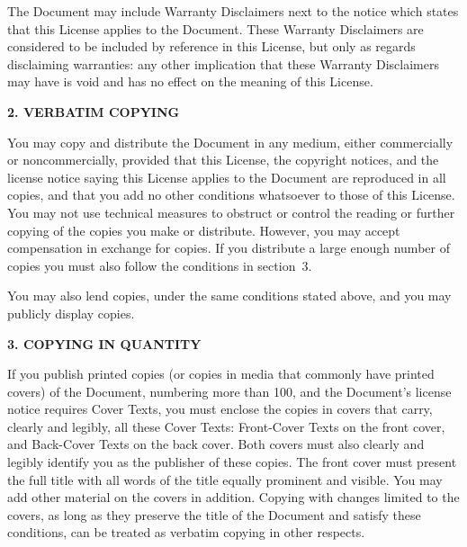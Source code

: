 \documentclass[10pt,a4paper,ngerman,titlepage,tocindentauto]{article}
\begin{document}
\begin{multicols}{3}
{					The Document may include Warranty Disclaimers next to the notice which
					states that this License applies to the Document.  These Warranty
					Disclaimers are considered to be included by reference in this
					License, but only as regards disclaiming warranties: any other
					implication that these Warranty Disclaimers may have is void and has
					no effect on the meaning of this License.


					\begin{center}
					{\bf 2. VERBATIM COPYING\par}
					\end{center}

					You may copy and distribute the Document in any medium, either
					commercially or noncommercially, provided that this License, the
					copyright notices, and the license notice saying this License applies
					to the Document are reproduced in all copies, and that you add no other
					conditions whatsoever to those of this License.  You may not use
					technical measures to obstruct or control the reading or further
					copying of the copies you make or distribute.  However, you may accept
					compensation in exchange for copies.  If you distribute a large enough
					number of copies you must also follow the conditions in section~3.

					You may also lend copies, under the same conditions stated above, and
					you may publicly display copies.


					\begin{center}
					{\bf 3. COPYING IN QUANTITY\par}
					\end{center}

					If you publish printed copies (or copies in media that commonly have
					printed covers) of the Document, numbering more than 100, and the
					Document's license notice requires Cover Texts, you must enclose the
					copies in covers that carry, clearly and legibly, all these Cover
					Texts: Front-Cover Texts on the front cover, and Back-Cover Texts on
					the back cover.  Both covers must also clearly and legibly identify
					you as the publisher of these copies.  The front cover must present
					the full title with all words of the title equally prominent and
					visible.  You may add other material on the covers in addition.
					Copying with changes limited to the covers, as long as they preserve
					the title of the Document and satisfy these conditions, can be treated
					as verbatim copying in other respects.

}
\end{multicols}
\end{document}
